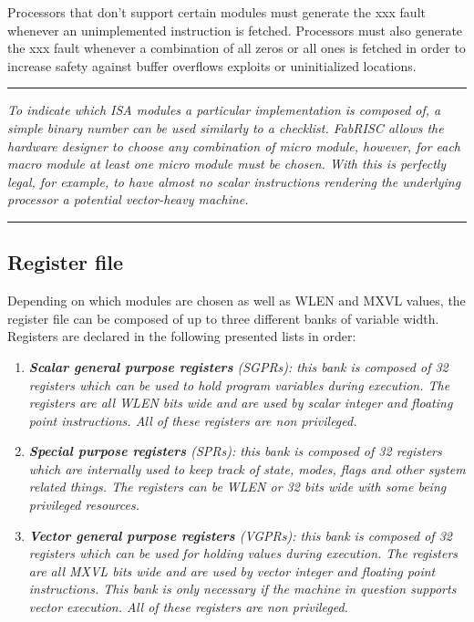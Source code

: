 \documentclass{article}
\begin{document}
        Processors that don't support certain modules must generate the xxx fault whenever an unimplemented instruction is fetched. Processors must also generate the xxx fault whenever a combination of all zeros or all ones is fetched in order to increase safety against buffer overflows exploits or uninitialized locations. 

        \par\noindent\rule{\textwidth}{0.4pt}
        \textit{To indicate which ISA modules a particular implementation is composed of, a simple binary number can be used similarly to a checklist. FabRISC allows the hardware designer to choose any combination of micro module, however, for each macro module at least one micro module must be chosen. With this is perfectly legal, for example, to have almost no scalar instructions rendering the underlying processor a potential vector-heavy machine.}
        \par\noindent\rule{\textwidth}{0.4pt}

        \subsection{Register file}

            \vspace{10pt}

            Depending on which modules are chosen as well as WLEN and MXVL values, the register file can be composed of up to three different banks of variable width. Registers are declared in the following presented lists in order:

            \begin{enumerate}

                \item \textit{\textbf{Scalar general purpose registers} (SGPRs): this bank is composed of 32 registers which can be used to hold program variables during execution. The registers are all WLEN bits wide and are used by scalar integer and floating point instructions. All of these registers are non privileged.}

                \item \textit{\textbf{Special purpose registers} (SPRs): this bank is composed of 32 registers which are internally used to keep track of state, modes, flags and other system related things. The registers can be WLEN or 32 bits wide with some being privileged resources.}

                \item \textit{\textbf{Vector general purpose registers} (VGPRs): this bank is composed of 32 registers which can be used for holding values during execution. The registers are all MXVL bits wide and are used by vector integer and floating point instructions. This bank is only necessary if the machine in question supports vector execution. All of these registers are non privileged.}

            \end{enumerate}
\end{document}
